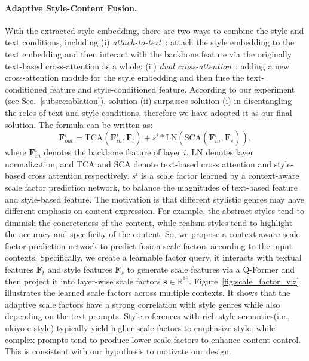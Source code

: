\paragraph{Adaptive Style-Content Fusion.}
\label{sec:fusion}
With the extracted style embedding, there are two ways to combine the style and text conditions, including (i) \textit{attach-to-text}~\cite{composer,gligen,ramesh2022hierarchical}: attach the style embedding to the text embedding and then interact with the backbone feature via the originally text-based cross-attention as a whole; (ii) \textit{dual cross-attention}~\cite{wei2023elite,ye2023ipadapter}: adding a new cross-attention module for the style embedding and then fuse the text-conditioned feature and style-conditioned feature.
According to our experiment (see Sec.~\ref{subsec:ablation}), solution (ii) surpasses solution (i) in disentangling the roles of text and style conditions, therefore we have adopted it as our final solution. The formula can be written as:
\vspace{-0.3em}
\begin{equation}
    \mathbf{F}_{out}^{i} = \text{TCA}(\mathbf{F}_{in}^i, \mathbf{F}_t) + s^i * \text{LN}(\text{SCA}(\mathbf{F}_{in}^i, \mathbf{F}_s)),
\end{equation}
where $\mathbf{F}_{in}^i$ denotes the backbone feature of layer $i$, LN denotes layer normalization, and TCA and SCA denote text-based cross attention and style-based cross attention respectively. $s^i$ is a scale factor learned by a context-aware scale factor prediction network, to balance the magnitudes of text-based feature and style-based feature.
The motivation is that different stylistic genres may have different emphasis on content expression. For example, the abstract styles tend to diminish the concreteness of the content, while realism styles tend to highlight the accuracy and specificity of the content. So, we propose a context-aware scale factor prediction network to predict fusion scale factors according to the input contexts.
Specifically, we create a learnable factor query, it interacts with textual features $\mathbf{F}_t$ and style features $\mathbf{F}_s$ to generate scale features via a Q-Former and then project it into layer-wise scale factors $\mathbf{s} \in \mathbb{R}^{16}$.
Figure~\ref{fig:scale_factor_viz} illustrates the learned scale factors across multiple contexts. It shows that the adaptive scale factors have a strong correlation with style genres while also depending on the text prompts. Style references with rich style-semantics(i.e., ukiyo-e style) typically yield higher scale factors to emphasize style; while complex prompts tend to produce lower scale factors to enhance content control.  This is consistent with our hypothesis to motivate our design.


